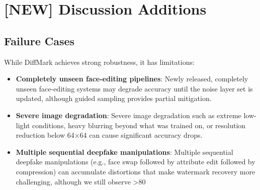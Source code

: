 \documentclass{article}
\begin{document}
\section{[NEW] Discussion Additions}
\subsection{Failure Cases}
While DiffMark achieves strong robustness, it has limitations:
\begin{itemize}
\item \textbf{Completely unseen face-editing pipelines}: Newly released, completely unseen face-editing systems may degrade accuracy until the noise layer set is updated, although guided sampling provides partial mitigation.
\item \textbf{Severe image degradation}: Severe image degradation such as extreme low-light conditions, heavy blurring beyond what was trained on, or resolution reduction below 64×64 can cause significant accuracy drops.
\item \textbf{Multiple sequential deepfake manipulations}: Multiple sequential deepfake manipulations (e.g., face swap followed by attribute edit followed by compression) can accumulate distortions that make watermark recovery more challenging, although we still observe >80%
\end{itemize}
\end{document}
